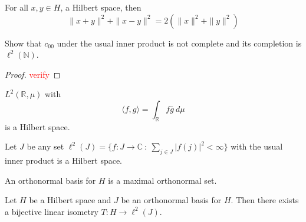 \begin{proposition}
  For all $x, y \in H$, a Hilbert space, then \[
    \|x + y\|^2 + \|x-y\|^2  = 2(\|x\|^2 + \|y\|^2)
  \]
\end{proposition}

\begin{example}
  Show that $c_{00}$ under the usual inner product is not complete
  and its completion is $\ell^2(\mathbb{N})$.
\end{example}
\begin{proof}
  \textcolor{red}{verify}
\end{proof}

\begin{example}
  $L^2(\mathbb{R},  \mu)$ with \[
    \langle f , g \rangle  = \int_\mathbb{R}  f \overline{g} \ d \mu
  \]
  is a Hilbert space.
\end{example}

\begin{example}
  Let $J$ be any set $\ell^2(J) = \{  f: J \to \mathbb{C}  \ : \
  \sum_{j \in J} |f(j)|^2 < \infty  \}$ with the usual inner product
  is a Hilbert space.
\end{example}

\begin{definition}
  An orthonormal basis for $H$ is a maximal orthonormal set.
\end{definition}

\begin{theorem}
  Let $H$ be a Hilbert space and $J$ be an orthonormal basis for $H$.
  Then there exists a bijective linear isometry $T : H \to \ell^2(J)$.
\end{theorem}


